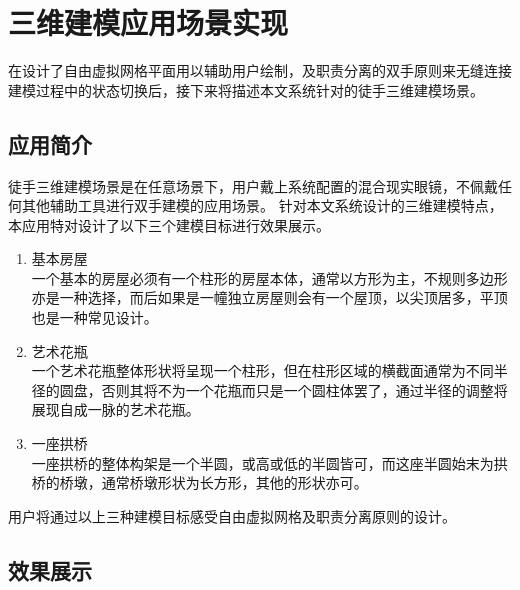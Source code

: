 \section{三维建模应用场景实现}
在设计了自由虚拟网格平面用以辅助用户绘制，及职责分离的双手原则来无缝连接建模过程中的状态切换后，接下来将描述本文系统针对的徒手三维建模场景。

\begin{figure}[!htp]
	\centering
	\subfigure{\label{fig:model:1}}\addtocounter{subfigure}{-2}
	\subfigure{\label{fig:model:2}}\addtocounter{subfigure}{-2}
	\vspace{-1em}
\end{figure}

\subsection{应用简介}
徒手三维建模场景是在任意场景下，用户戴上系统配置的混合现实眼镜，不佩戴任何其他辅助工具进行双手建模的应用场景。
针对本文系统设计的三维建模特点，本应用特对设计了以下三个建模目标进行效果展示。
\begin{enumerate}
\item 基本房屋\hfill\\ 
一个基本的房屋必须有一个柱形的房屋本体，通常以方形为主，不规则多边形亦是一种选择，而后如果是一幢独立房屋则会有一个屋顶，以尖顶居多，平顶也是一种常见设计。
\item 艺术花瓶\hfill\\ 
一个艺术花瓶整体形状将呈现一个柱形，但在柱形区域的横截面通常为不同半径的圆盘，否则其将不为一个花瓶而只是一个圆柱体罢了，通过半径的调整将展现自成一脉的艺术花瓶。
\item 一座拱桥\hfill\\ 
一座拱桥的整体构架是一个半圆，或高或低的半圆皆可，而这座半圆始末为拱桥的桥墩，通常桥墩形状为长方形，其他的形状亦可。
\end{enumerate}

用户将通过以上三种建模目标感受自由虚拟网格及职责分离原则的设计。

\subsection{效果展示}


